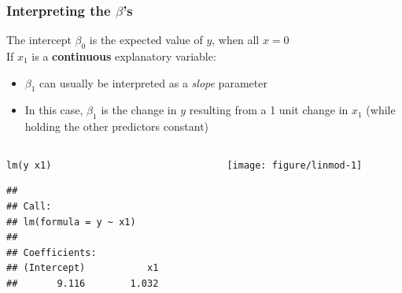\documentclass[color=usenames,dvipsnames]{beamer}\usepackage[]{graphicx}\usepackage[]{color}
\makeatletter
\newcommand{\hlopt}[1]{\textcolor[rgb]{0,0,0}{#1}}%
\newcommand{\hlstd}[1]{\textcolor[rgb]{0,0,0}{#1}}%
\newcommand{\hlkwd}[1]{\textcolor[rgb]{0.004,0.004,0.506}{#1}}%
\newenvironment{kframe}{%
 \def\at@end@of@kframe{}%
 \ifinner\ifhmode%
  \def\at@end@of@kframe{\end{minipage}}%
  \begin{minipage}{\columnwidth}%
 \fi\fi%
 \def\FrameCommand##1{\hskip\@totalleftmargin \hskip-\fboxsep
 \colorbox{shadecolor}{##1}\hskip-\fboxsep
     \hskip-\linewidth \hskip-\@totalleftmargin \hskip\columnwidth}%
 \MakeFramed {\advance\hsize-\width
   \@totalleftmargin\z@ \linewidth\hsize
   \@setminipage}}%
 {\par\unskip\endMakeFramed%
 \at@end@of@kframe}
\newenvironment{knitrout}{}{} %
\makeatother
\begin{document}
\begin{frame}[fragile]
  \frametitle{Interpreting the $\beta$'s}
  \small 
  The intercept $\beta_0$ is the expected value of $y$, when all $x=0$ \\
  \pause
  \vfill
  If $x_1$ is a {\bf continuous} explanatory variable: %
  \begin{itemize}
    \item $\beta_1$ can usually be interpreted as a \textit{slope}
      parameter
    \item In this case, $\beta_1$ is the
      change in $y$ resulting from a 1 unit change in $x_1$ (while
      holding the other predictors constant)
    \end{itemize}
\pause
\vfill

\centering
\begin{columns}
  \begin{column}{0.5\textwidth}
\begin{knitrout}\tiny
{}\color{fgcolor}\begin{kframe}
\begin{alltt}
\hlkwd{lm}\hlstd{(y}\hlopt{~}\hlstd{x1)}
\end{alltt}
\begin{verbatim}
## 
## Call:
## lm(formula = y ~ x1)
## 
## Coefficients:
## (Intercept)           x1  
##       9.116        1.032
\end{verbatim}
\end{kframe}
\end{knitrout}
  \end{column}
  \begin{column}{0.4\textwidth}
  \texttt{[image: figure/linmod-1]} \\
  \end{column}
\end{columns}
\end{frame}
\end{document}
